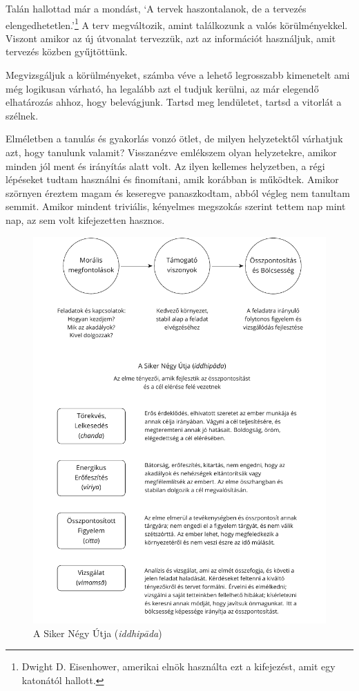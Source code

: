 
Talán hallottad már a mondást, `A tervek haszontalanok, de a tervezés
elengedhetetlen.'\footnote{Dwight D. Eisenhower, amerikai elnök
  használta ezt a kifejezést, amit egy katonától hallott.} A terv
megváltozik, amint találkozunk a valós körülményekkel. Viszont amikor az
új útvonalat tervezzük, azt az információt használjuk, amit tervezés
közben gyűjtöttünk.

Megvizsgáljuk a körülményeket, számba véve a lehető legrosszabb
kimenetelt ami még logikusan várható, ha legalább azt el tudjuk kerülni,
az már elegendő elhatározás ahhoz, hogy belevágjunk. Tartsd meg
lendületet, tartsd a vitorlát a szélnek.

Elméletben a tanulás és gyakorlás vonzó ötlet, de milyen helyzetektől
várhatjuk azt, hogy tanulunk valamit? Visszanézve emlékszem olyan
helyzetekre, amikor minden jól ment és irányítás alatt volt. Az ilyen
kellemes helyzetben, a régi lépéseket tudtam használni és finomítani,
amik korábban is működtek. Amikor szörnyen éreztem magam és keseregve
panaszkodtam, abból végleg nem tanultam semmit. Amikor mindent
triviális, kényelmes megszokás szerint tettem nap mint nap, az sem volt
kifejezetten hasznos.

\clearpage
\figurepagelayout

\begin{figure}[h]
\caption{A Siker Négy Útja (\emph{iddhipāda})}\label{fig-success}
\bigskip
\includegraphics[width=0.95\linewidth]{./manuscript/tex/diagrams/paths-to-success-hu.pdf}
\end{figure}

